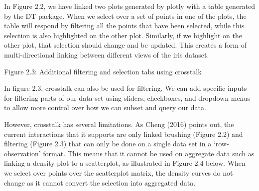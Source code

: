 \documentclass[11pt,]{report}
\newenvironment{Shaded}{\begin{snugshade}}{\end{snugshade}}
\newcommand{\KeywordTok}[1]{\textcolor[rgb]{0.13,0.29,0.53}{\textbf{#1}}}
\newcommand{\DataTypeTok}[1]{\textcolor[rgb]{0.13,0.29,0.53}{#1}}
\newcommand{\DecValTok}[1]{\textcolor[rgb]{0.00,0.00,0.81}{#1}}
\newcommand{\StringTok}[1]{\textcolor[rgb]{0.31,0.60,0.02}{#1}}
\newcommand{\OtherTok}[1]{\textcolor[rgb]{0.56,0.35,0.01}{#1}}
\newcommand{\OperatorTok}[1]{\textcolor[rgb]{0.81,0.36,0.00}{\textbf{#1}}}
\newcommand{\NormalTok}[1]{#1}
\begin{document}
In Figure 2.2, we have linked two plots generated by \textsf{plotly}
with a table generated by the \textsf{DT} package. When we select over a
set of points in one of the plots, the table will respond by filtering
all the points that have been selected, while this selection is also
highlighted on the other plot. Similarly, if we highlight on the other
plot, that selection should change and be updated. This creates a form
of multi-directional linking between different views of the iris
dataset.

Figure 2.3: Additional filtering and selection tabs using crosstalk

\begin{Shaded}
\end{Shaded}

In figure 2.3, \textsf{crosstalk} can also be used for filtering. We can
add specific inputs for filtering parts of our data set using sliders,
checkboxes, and dropdown menus to allow more control over how we can
subset and query our data.

However, \textsf{crosstalk} has several limitations. As Cheng (2016)
points out, the current interactions that it supports are only linked
brushing (Figure 2.2) and filtering (Figure 2.3) that can only be done
on a single data set in a `row-observation' format. This means that it
cannot be used on aggregate data such as linking a density plot to a
scatterplot, as illustrated in Figure 2.4 below. When we select over
points over the scatterplot matrix, the density curves do not change as
it cannot convert the selection into aggregated data.
\end{document}
